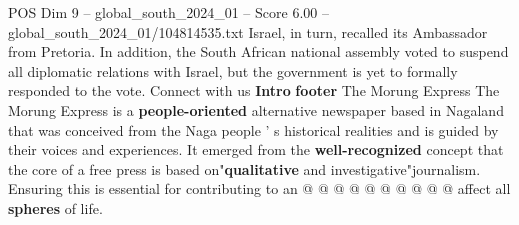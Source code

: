 \begin{textsample}{POS Dim 9 – global\_south\_2024\_01 – Score 6.00 – global\_south\_2024\_01/104814535.txt}
Israel, in turn, recalled its Ambassador from Pretoria.
In addition, the South African national assembly voted to suspend all diplomatic relations with Israel, but the government is yet to formally responded to the vote.
Connect with us \textbf{Intro} \textbf{footer} The Morung Express The Morung Express is a \textbf{people-oriented} alternative newspaper based in Nagaland that was conceived from the Naga people ' s historical realities and is guided by their voices and experiences.
It emerged from the \textbf{well-recognized} concept that the core of a free press is based on"\textbf{qualitative} and investigative"journalism.
Ensuring this is essential for contributing to an @ @ @ @ @ @ @ @ @ @ affect all \textbf{spheres} of life.

\end{textsample}

